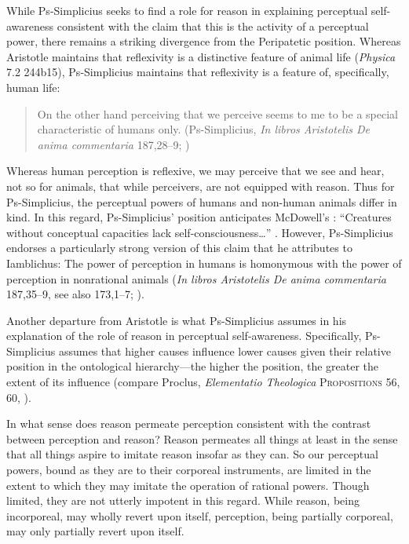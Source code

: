 While Ps-Simplicius seeks to find a role for reason in explaining perceptual self-awareness consistent with the claim that this is the activity of a perceptual power, there remains a striking divergence from the Peripatetic position. Whereas Aristotle maintains that reflexivity is a distinctive feature of animal life (\emph{Physica} 7.2 244b15), Ps-Simplicius maintains that reflexivity is a feature of, specifically, human life:
\begin{quote}
	On the other hand perceiving that we perceive seems to me to be a special characteristic of humans only. (Ps-Simplicius, \emph{In libros Aristotelis De anima commentaria} 187,28–9; \citealt[40]{Blumenthal:2000rf})
\end{quote}
Whereas human perception is reflexive, we may perceive that we see and hear, not so for animals, that while perceivers, are not equipped with reason. Thus for Ps-Simplicius, the perceptual powers of humans and non-human animals differ in kind. In this regard, Ps-Simplicius' position anticipates McDowell's \citeyearpar[49–50, 63–5, 69–70, 114–23, 182–4]{McDowell:1994am}: ``Creatures without conceptual capacities lack self-consciousness\ldots'' \citet[114]{McDowell:1994am}. However, Ps-Simplicius endorses a particularly strong version of this claim that he attributes to Iamblichus: The power of perception in humans is homonymous with the power of perception in nonrational animals (\emph{In libros Aristotelis De anima commentaria} 187,35–9, see also 173,1–7; \citealt[109]{Lautner:1994cs}).

Another departure from Aristotle is what Ps-Simplicius assumes in his explanation of the role of reason in perceptual self-awareness. Specifically, Ps-Simplicius assumes that higher causes influence lower causes given their relative position in the ontological hierarchy—the higher the position, the greater the extent of its influence (compare Proclus, \emph{Elementatio Theologica} \textsc{Propositions} 56, 60, \citealt[125 n113]{Blumenthal:2000rf}). 

In what sense does reason permeate perception consistent with the contrast between perception and reason? Reason permeates all things at least in the sense that all things aspire to imitate reason insofar as they can. So our perceptual powers, bound as they are to their corporeal instruments, are limited in the extent to which they may imitate the operation of rational powers. Though limited, they are not utterly impotent in this regard. While reason, being incorporeal, may wholly revert upon itself, perception, being partially corporeal, may only partially revert upon itself. 

